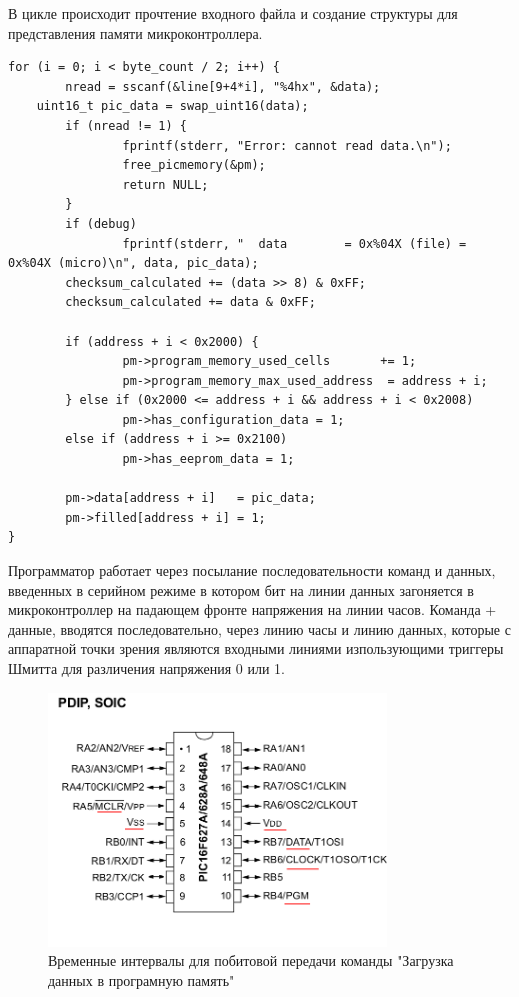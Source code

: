 В цикле происходит прочтение входного файла и создание структуры для представления памяти микроконтроллера.
\begin{small}
\begin{verbatim}
for (i = 0; i < byte_count / 2; i++) {
        nread = sscanf(&line[9+4*i], "%4hx", &data);
	uint16_t pic_data = swap_uint16(data);
        if (nread != 1) {
                fprintf(stderr, "Error: cannot read data.\n");
                free_picmemory(&pm);
                return NULL;
        }
        if (debug)
                fprintf(stderr, "  data        = 0x%04X (file) = 0x%04X (micro)\n", data, pic_data);
        checksum_calculated += (data >> 8) & 0xFF;
        checksum_calculated += data & 0xFF;

        if (address + i < 0x2000) {
                pm->program_memory_used_cells       += 1;
                pm->program_memory_max_used_address  = address + i;
        } else if (0x2000 <= address + i && address + i < 0x2008)
                pm->has_configuration_data = 1;
        else if (address + i >= 0x2100)
                pm->has_eeprom_data = 1;

        pm->data[address + i]   = pic_data;
        pm->filled[address + i] = 1;
}
\end{verbatim}
\end{small}

Программатор работает через посылание 
последовательности команд и данных, введенных в серийном режиме
в котором бит на линии данных загоняется в микроконтроллер на падающем
фронте напряжения на линии часов. Команда + данные, вводятся последовательно, 
через линию часы и линию данных, которые с аппаратной точки зрения являются входными линиями 
изпользующими триггеры Шмитта для различения напряжения 0 или 1. 

\begin{figure}[h!]
    \centering
    \includegraphics[width=0.8\textwidth]{2017-05-07_at_22:31:52_screenshot.png}
    \caption{Временные интервалы для побитовой передачи команды "Загрузка данных в програмную память"}
\end{figure}


